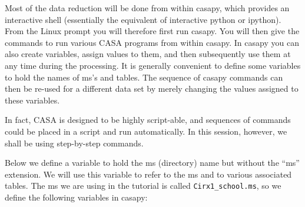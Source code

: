 \documentclass[force,almostfull,justified]{tufte-book}
\begin{document}
\bigskip
{}

\bigskip
\bigskip
Most of the data reduction will be done from within casapy, which provides an interactive shell
(essentially the equivalent of interactive python or ipython). From the Linux prompt you will
therefore first run casapy.  You will then give the commands to run various CASA programs from within
casapy.  In casapy you can also create variables, assign values to them, and then subsequently use
them at any time during the processing.  It is generally convenient to define some variables to hold
the names of ms's and tables.  The sequence of casapy commands can then be re-used for a different
data set by merely changing the values assigned to these variables.

\bigskip
{}

\bigskip
In fact, CASA is designed to be highly script-able, and sequences of commands could be placed in a
script and run automatically.  In this session, however, we shall be using step-by-step commands.

\bigskip
{}

\bigskip
Below we define a variable to hold the ms (directory) name but without the ``ms'' extension.  We will
use this variable to refer to the ms and to various associated tables.  The ms we are using in the
tutorial is called {\tt Cirx1\_school.ms}, so we define the following variables in casapy:
\end{document}
